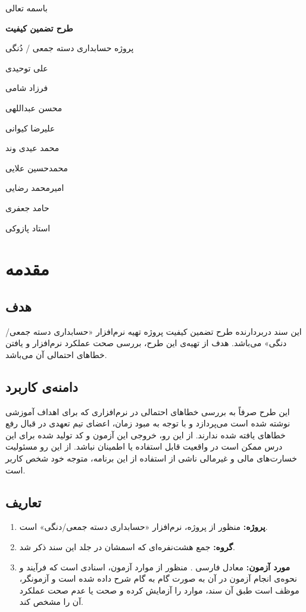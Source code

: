 \documentclass[12pt]{article}
\begin{document}
	\begin{titlepage}
		\centering
		{\large باسمه تعالی\par}
		\vspace{1.5cm}
		{\huge \bfseries طرح تضمین کیفیت\par}
		\vspace{2cm}
		{\LARGE پروژه حسابداری دسته جمعی / دُنگی\par}
		\vfill
		{\large علی توحیدی
\par	
فرزاد شامی
\par
محسن عبداللهی

\par
علیرضا کیوانی

\par
محمد عیدی وند

\par
محمدحسین علایی

\par
امیرمحمد رضایی

\par
حامد جعفری
}
		\vfill
		{\large استاد پازوکی}
	\end{titlepage}
	\tableofcontents
	\newpage
\section{مقدمه}
\subsection{هدف}
این سند دربردارنده طرح تضمین کیفیت پروژه تهیه نرم‌افزار «حسابداری دسته جمعی/دنگی» می‌باشد. هدف از تهیه‌ی این طرح، بررسی صحت عملکرد نرم‌افزار و یافتن خطاهای احتمالی آن می‌باشد.
\subsection{دامنه‌ی کاربرد}
این طرح صرفاً به بررسی خطاهای احتمالی در نرم‌افزاری که برای اهداف آموزشی نوشته شده است می‌پردازد و با توجه به مبود زمان، اعضای تیم تعهدی در قبال رفع خطاهای یافته شده ندارند. از این رو، خروجی این آزمون و کد تولید شده برای این درس ممکن است در واقعیت قابل استفاده  یا اطمینان نباشد. از این رو مسئولیت خسارت‌های مالی و غیرمالی ناشی از استفاده از این برنامه، متوجه خود شخص کاربر است.
\subsection{تعاریف}
\begin{enumerate}[ا)]
	\item \textbf{پروژه:}
	منظور از پروژه، نرم‌افزار «حسابداری دسته جمعی/دنگی» است.
	\item \textbf{گروه:}
جمع هشت‌نفره‌ای که اسمشان در جلد این سند ذکر شد.
	\item \textbf{مورد آزمون:}
معادل فارسی 
.
منظور از موارد آزمون، اسنادی است که فرآیند و نحوه‌ی انجام آزمون در آن به صورت گام به گام شرح داده شده است و آزمونگر، موظف است طبق آن سند، موارد را آزمایش کرده و صحت یا عدم صحت عملکرد آن را مشخص کند.
\end{enumerate}
\end{document}

